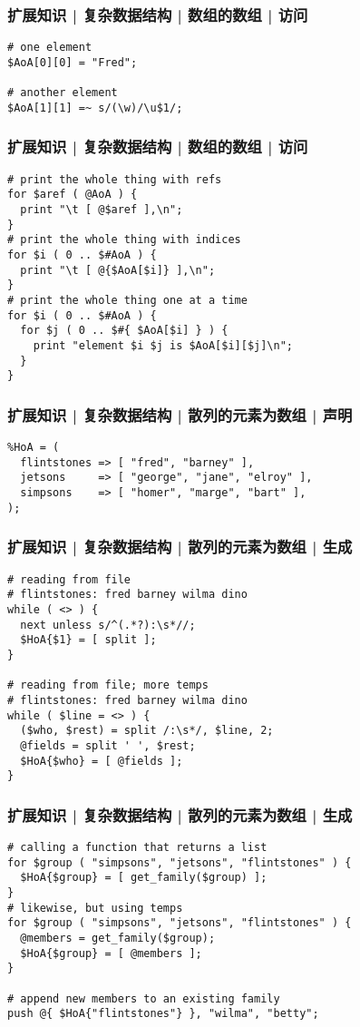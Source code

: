 \begin{frame}[fragile]
  \frametitle{扩展知识 | 复杂数据结构 | 数组的数组 | 访问}
\begin{lstlisting}
# one element
$AoA[0][0] = "Fred";

# another element
$AoA[1][1] =~ s/(\w)/\u$1/;
\end{lstlisting}
\end{frame}

\begin{frame}[fragile]
  \frametitle{扩展知识 | 复杂数据结构 | 数组的数组 | 访问}
\begin{lstlisting}
# print the whole thing with refs
for $aref ( @AoA ) {
  print "\t [ @$aref ],\n";
}
# print the whole thing with indices
for $i ( 0 .. $#AoA ) {
  print "\t [ @{$AoA[$i]} ],\n";
}
# print the whole thing one at a time
for $i ( 0 .. $#AoA ) {
  for $j ( 0 .. $#{ $AoA[$i] } ) {
    print "element $i $j is $AoA[$i][$j]\n";
  }
}
\end{lstlisting}
\end{frame}

\begin{frame}[fragile]
  \frametitle{扩展知识 | 复杂数据结构 | 散列的元素为数组 | 声明}
\begin{lstlisting}
%HoA = (
  flintstones => [ "fred", "barney" ],
  jetsons     => [ "george", "jane", "elroy" ],
  simpsons    => [ "homer", "marge", "bart" ],
);
\end{lstlisting}
\end{frame}

\begin{frame}[fragile]
  \frametitle{扩展知识 | 复杂数据结构 | 散列的元素为数组 | 生成}
\begin{lstlisting}
# reading from file
# flintstones: fred barney wilma dino
while ( <> ) {
  next unless s/^(.*?):\s*//;
  $HoA{$1} = [ split ];
}

# reading from file; more temps
# flintstones: fred barney wilma dino
while ( $line = <> ) {
  ($who, $rest) = split /:\s*/, $line, 2;
  @fields = split ' ', $rest;
  $HoA{$who} = [ @fields ];
}
\end{lstlisting}
\end{frame}

\begin{frame}[fragile]
  \frametitle{扩展知识 | 复杂数据结构 | 散列的元素为数组 | 生成}
\begin{lstlisting}
# calling a function that returns a list
for $group ( "simpsons", "jetsons", "flintstones" ) {
  $HoA{$group} = [ get_family($group) ];
}
# likewise, but using temps
for $group ( "simpsons", "jetsons", "flintstones" ) {
  @members = get_family($group);
  $HoA{$group} = [ @members ];
}

# append new members to an existing family
push @{ $HoA{"flintstones"} }, "wilma", "betty";
\end{lstlisting}
\end{frame}

